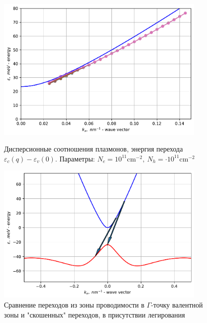 \documentclass[../main.tex]{subfiles}
\begin{document}
    \begin{figure}[h]
        \begin{minipage}[h]{0.49\textwidth}
            \includegraphics[width=0.9\textwidth]{./images/6-0-1-4.2-energy-plasmon-vs-disp.pdf}
            \caption{Дисперсионные соотношения плазмонов, энергия перехода 
            $\varepsilon_c(q)-\varepsilon_v(0)$. Параметры: $N_e = 10^{11} \text{cm}^{-2},~
            N_h=\cdot 10^{11} \text{cm}^{-2}$}
        \end{minipage}
        \hfill
        \begin{minipage}[h]{0.49\textwidth}
            \includegraphics[width=0.9\textwidth]{./images/6-0-1-4.2-energy-transition.pdf}
            \caption{Сравнение переходов из зоны проводимости в $\Gamma$-точку валентной зоны 
            и "скошенных" переходов, в присутствии легирования}
        \end{minipage}
    \end{figure}
\end{document}
